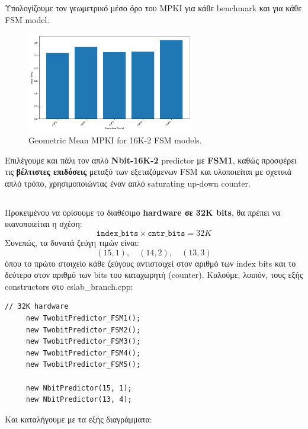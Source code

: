 \documentclass{article}
\begin{document}
 Υπολογίζουμε τον γεωμετρικό μέσο όρο του MPKI για κάθε benchmark και για κάθε FSM model. 

 \begin{figure}[H]
     \centering
     \includegraphics[width=0.65\textwidth]{figures/5_3_b/geom_mean.png}
     \caption{Geometric Mean MPKI for 16K-2 FSM models.}
     \label{fig:mean_mpkis_FSMs}
 \end{figure}

 Επιλέγουμε και πάλι τον απλό \textbf{Nbit-16K-2} predictor με \textbf{FSM1}, καθώς προσφέρει τις \textbf{βέλτιστες επιδόσεις} μεταξύ των εξεταζόμενων FSM και υλοποιείται με σχετικά απλό τρόπο, χρησιμοποιώντας έναν απλό saturating up-down counter.

 \subsection{}
 Προκειμένου να ορίσουμε το διαθέσιμο \textbf{hardware σε 32K bits}, θα πρέπει να ικανοποιείται η σχέση:
 \[
 \texttt{index\_bits} \times \texttt{cntr\_bits} = 32K
 \]
 Συνεπώς, τα δυνατά ζεύγη τιμών είναι:
 \[
 (15, 1),\quad (14, 2),\quad (13, 3)
 \]
 όπου το πρώτο στοιχείο κάθε ζεύγους αντιστοιχεί στον αριθμό των index bits και το δεύτερο στον αριθμό των bits του καταχωρητή (counter). Καλούμε, λοιπόν, τους εξής constructors στο cslab\_branch.cpp:


 \begin{lstlisting}[style=cppstyle]
     // 32K hardware
     new TwobitPredictor_FSM1();
     new TwobitPredictor_FSM2();
     new TwobitPredictor_FSM3();
     new TwobitPredictor_FSM4();
     new TwobitPredictor_FSM5();

     new NbitPredictor(15, 1);
     new NbitPredictor(13, 4);
 \end{lstlisting}

Και καταλήγουμε με τα εξής διαγράμματα:
\end{document}
